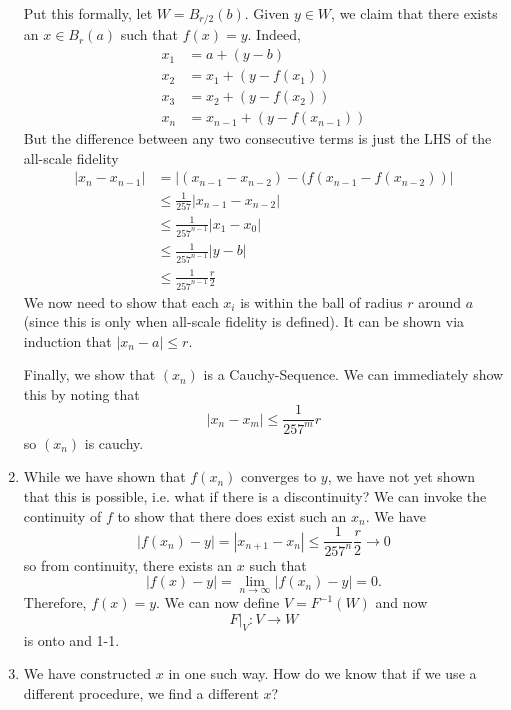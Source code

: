 \documentclass{article}
\numberwithin{equation}{section}
\begin{document}
\begin{enumerate}
          Put this formally, let $W=B_{r/2}(b).$ Given $y\in W$, we claim that there exists an $x\in B_r(a)$ such that $f(x)=y.$ Indeed,
          \begin{align}
              x_1 & = a+(y-b)                  \\
              x_2 & = x_1+(y-f(x_1))           \\
              x_3 & = x_2+(y-f(x_2))           \\
              x_n & = x_{n-1} + (y-f(x_{n-1}))
          \end{align}
          But the difference between any two consecutive terms is just the LHS of the all-scale fidelity
          \begin{align}
              |x_n-x_{n-1}| & = |(x_{n-1}-x_{n-2})-(f(x_{n-1}-f(x_{n-2}))| \\
                            & \le \frac{1}{257}|x_{n-1}-x_{n-2}|           \\
                            & \le \frac{1}{257^{n-1}} |x_1-x_0|            \\
                            & \le \frac{1}{257^{n-1}} | y-b|               \\
                            & \le \frac{1}{257^{n-1}} \frac{r}{2}
          \end{align}
          We now need to show that each $x_i$ is within the ball of radius $r$ around $a$ (since this is only when all-scale fidelity is defined). It can be shown via induction that $|x_n-a| \le r.$

          Finally, we show that $(x_n)$ is a Cauchy-Sequence. We can immediately show this by noting that
          \begin{equation}
              |x_n-x_m| \le \frac{1}{257^m}r
          \end{equation}
          so $(x_n)$ is cauchy.
    \item While we have shown that $f(x_n)$ converges to $y$, we have not yet shown that this is possible, i.e. what if there is a discontinuity? We can invoke the continuity of $f$ to show that there does exist such an $x_n.$ We have
          \begin{equation}
              |f(x_n)-y| = |x_{n+1}-x_n| \le \frac{1}{257^n}\frac{r}{2} \rightarrow 0
          \end{equation}
          so from continuity, there exists an $x$ such that
          \begin{equation}
              |f(x)-y| = \lim_{n\to \infty} |f(x_n)-y|  = 0.
          \end{equation}
          Therefore, $f(x)=y.$ We can now define $V=F^{-1}(W)$ and now
          \begin{equation}
              F|_V: V\rightarrow W
          \end{equation}
          is onto and 1-1.
    \item We have constructed $x$ in one such way. How do we know that if we use a different procedure, we find a different $x$?


\end{enumerate}
\end{document}

